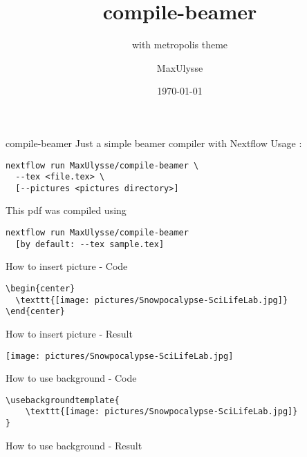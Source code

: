 \documentclass{beamer}
\author{MaxUlysse}
\title{compile-beamer}
\subtitle{with metropolis theme}
\institute{
	SciLifeLab - Karolinska Institutet\\
	\vfill
	\texttt{[image: pictures/SciLifeLab]}
	\hfill
	\texttt{[image: pictures/KI]}
	\vfill
}
\date{\today}
\begin{document}
\maketitle

\begin{frame}[fragile]{compile-beamer}
  Just a simple beamer compiler with Nextflow
  Usage :
  \begin{verbatim}
nextflow run MaxUlysse/compile-beamer \
  --tex <file.tex> \
  [--pictures <pictures directory>]
  \end{verbatim}
  This pdf was compiled using
  \begin{verbatim}
nextflow run MaxUlysse/compile-beamer
  [by default: --tex sample.tex]
  \end{verbatim}
\end{frame}

\begin{frame}[fragile]{How to insert picture - Code}
  \begin{verbatim}
\begin{center}
  \texttt{[image: pictures/Snowpocalypse-SciLifeLab.jpg]}
\end{center}
  \end{verbatim}
\end{frame}

\begin{frame}{How to insert picture - Result}
  \begin{center}
    \texttt{[image: pictures/Snowpocalypse-SciLifeLab.jpg]}
  \end{center}
\end{frame}

\begin{frame}[fragile]{How to use background - Code}
  \begin{verbatim}
  \end{verbatim}
\end{frame}

\usebackgroundtemplate{
	\texttt{[image: pictures/Snowpocalypse-SciLifeLab.jpg]}
}

\begin{frame}{How to use background - Result}
\end{frame}
\end{document}
